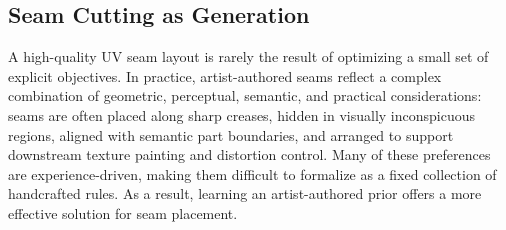 \subsection{Seam Cutting as Generation}
\label{sec:formulation}




A high-quality UV seam layout is rarely the result of optimizing a small set of explicit objectives. In practice, artist-authored seams reflect a complex combination of geometric, perceptual, semantic, and practical considerations: seams are often placed along sharp creases, hidden in visually inconspicuous regions, aligned with semantic part boundaries, and arranged to support downstream texture painting and distortion control. Many of these preferences are experience-driven, making them difficult to formalize as a fixed collection of handcrafted rules. As a result, learning an artist-authored prior offers a more effective solution for seam placement.

